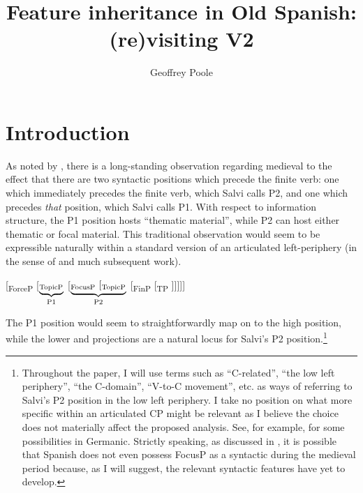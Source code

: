 \documentclass[output=paper]{LSP/langsci}
\author{Geoffrey Poole  	\affiliation{Newcastle University}
}
\title{Feature inheritance in Old Spanish: (re)visiting V2}
\begin{document}
 
 

\section{Introduction}\label{sec:poole:1}
As noted by \citet{Salvi2012}, there is a long-standing observation regarding medieval  to the effect that there are two syntactic positions which precede the finite verb:  one which immediately precedes the finite verb, which Salvi calls P2, and one which precedes \textit{that} position, which Salvi calls P1.  With respect to information structure, the P1 position hosts ``thematic material'', while P2 can host either thematic or focal material.  This traditional observation would seem to be expressible naturally within a standard version of an articulated left-periphery (in the sense of \citealt{Rizzi1997} and much subsequent work).

\ea%
    \label{ex:poole:1}
	  [\textsubscript{ForceP} [$\underbrace{\textrm{\textsubscript{TopicP}}}_{\textrm{P1}}$ [$\underbrace{\textrm{\textsubscript{FocusP} [\textsubscript{TopicP}}}_{\textrm{P2}}$ [\textsubscript{FinP}   [\textsubscript{TP}  ]]]]]
    \z

\noindent The P1 position would seem to straightforwardly map on to the high  position, while the lower  and  projections are a natural locus for Salvi’s P2 position.\footnote{Throughout the paper, I will use terms such as ``C-related'', ``the low left periphery'', ``the C-domain'', ``V-to-C movement'', etc. as ways of referring to Salvi’s P2 position in the low left periphery.  I take no position on what more specific  within an articulated CP might be relevant as I believe the choice does not materially affect the proposed analysis.  See, for example, \citet{Walkden2015} for some possibilities in Germanic.  Strictly speaking, as discussed in , it is possible that Spanish does not even possess FocusP as a syntactic  during the medieval period because, as I will suggest, the relevant syntactic features have yet to develop.}  
\end{document}
